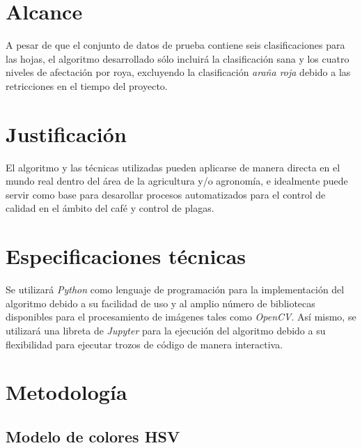 \section{Alcance}
A pesar de que el conjunto de datos de prueba contiene seis clasificaciones para las hojas, el algoritmo desarrollado sólo incluirá la clasificación sana y los cuatro niveles de afectación por roya, excluyendo la clasificación \textit{araña roja} debido a las retricciones en el tiempo del proyecto.

\section{Justificación}
El algoritmo y las técnicas utilizadas pueden aplicarse de manera directa en el mundo real dentro del área de la agricultura y/o agronomía, e idealmente puede servir como base para desarollar procesos automatizados para el control de calidad en el ámbito del café y control de plagas.
 
\section{Especificaciones técnicas}
Se utilizará \textit{Python} como lenguaje de programación para la implementación del algoritmo debido a su facilidad de uso y al amplio número de bibliotecas disponibles para el procesamiento de imágenes tales como \textit{OpenCV}. Así mismo, se utilizará una libreta de \textit{Jupyter} para la ejecución del algoritmo debido a su flexibilidad para ejecutar trozos de código de manera interactiva.

\section{Metodología}

\subsection{Modelo de colores HSV}